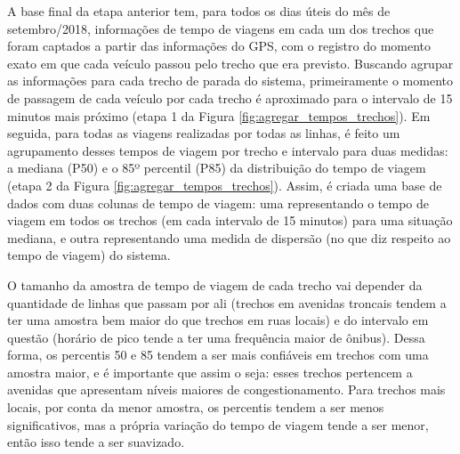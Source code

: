 \documentclass[        
    a4paper,          %
    12pt,             %
    chapter=TITLE,    %
    section=Title,    %
    subsection=Title, %
    oneside,          %
    english,          %
    spanish,          %
    brazil,           %
    fleqn             %
]{abntex2}
\begin{document}
  A base final da etapa anterior tem, para todos os dias úteis do mês de setembro/2018, informações de tempo de viagens em cada um dos trechos que foram captados a partir das informações do GPS, com o registro do momento exato em que cada veículo passou pelo trecho que era previsto. Buscando agrupar as informações para cada trecho de parada do sistema, primeiramente o momento de passagem de cada veículo por cada trecho é aproximado para o intervalo de 15 minutos mais próximo (etapa 1 da Figura \ref{fig:agregar_tempos_trechos}). Em seguida, para todas as viagens realizadas por todas as linhas, é feito um agrupamento desses tempos de viagem por trecho e intervalo para duas medidas: a mediana (P50) e o 85º percentil (P85) da distribuição do tempo de viagem (etapa 2 da Figura \ref{fig:agregar_tempos_trechos}). Assim, é criada uma base de dados com duas colunas de tempo de viagem: uma representando o tempo de viagem em todos os trechos (em cada intervalo de 15 minutos) para uma situação mediana, e outra representando uma medida de dispersão (no que diz respeito ao tempo de viagem) do sistema.
  
  \begin{figure}[!h]
  \captionsetup{width=16cm}
  \centering
  \end{figure}
  
  O tamanho da amostra de tempo de viagem de cada trecho vai depender da quantidade de linhas que passam por ali (trechos em avenidas troncais tendem a ter uma amostra bem maior do que trechos em ruas locais) e do intervalo em questão (horário de pico tende a ter uma frequência maior de ônibus). Dessa forma, os percentis 50 e 85 tendem a ser mais confiáveis em trechos com uma amostra maior, e é importante que assim o seja: esses trechos pertencem a avenidas que apresentam níveis maiores de congestionamento. Para trechos mais locais, por conta da menor amostra, os percentis tendem a ser menos significativos, mas a própria variação do tempo de viagem tende a ser menor, então isso tende a ser suavizado.
  
\end{document}
